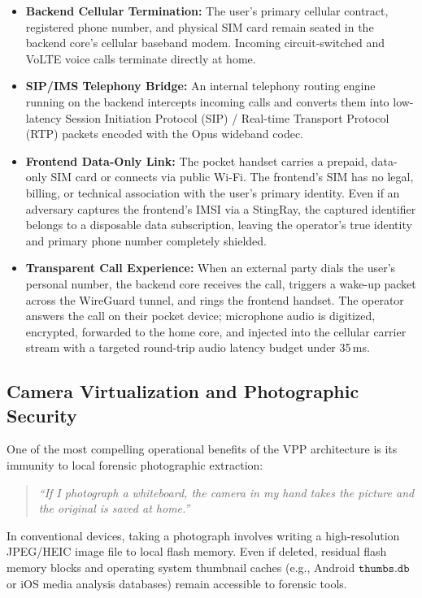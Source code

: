 \begin{itemize}
    \item \textbf{Backend Cellular Termination:} The user's primary cellular contract, registered phone number, and physical SIM card remain seated in the backend core's cellular baseband modem. Incoming circuit-switched and VoLTE voice calls terminate directly at home.
    \item \textbf{SIP/IMS Telephony Bridge:} An internal telephony routing engine running on the backend intercepts incoming calls and converts them into low-latency Session Initiation Protocol (SIP) / Real-time Transport Protocol (RTP) packets encoded with the Opus wideband codec.
    \item \textbf{Frontend Data-Only Link:} The pocket handset carries a prepaid, data-only SIM card or connects via public Wi-Fi. The frontend's SIM has no legal, billing, or technical association with the user's primary identity. Even if an adversary captures the frontend's IMSI via a StingRay, the captured identifier belongs to a disposable data subscription, leaving the operator's true identity and primary phone number completely shielded.
    \item \textbf{Transparent Call Experience:} When an external party dials the user's personal number, the backend core receives the call, triggers a wake-up packet across the WireGuard tunnel, and rings the frontend handset. The operator answers the call on their pocket device; microphone audio is digitized, encrypted, forwarded to the home core, and injected into the cellular carrier stream with a targeted round-trip audio latency budget under 35\,ms.
\end{itemize}

\subsection{Camera Virtualization and Photographic Security}
One of the most compelling operational benefits of the VPP architecture is its immunity to local forensic photographic extraction:
\begin{quote}
\textit{“If I photograph a whiteboard, the camera in my hand takes the picture and the original is saved at home.”}
\end{quote}

In conventional devices, taking a photograph involves writing a high-resolution JPEG/HEIC image file to local flash memory. Even if deleted, residual flash memory blocks and operating system thumbnail caches (e.g., Android $\texttt{thumbs.db}$ or iOS media analysis databases) remain accessible to forensic tools.

